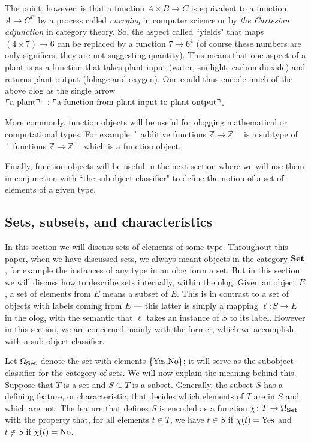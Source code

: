 \documentclass{amsart}
\def\to{\rightarrow}
\def\ZZ{{\mathbb Z}}
\def\ss{\subseteq}
\def\taking{\colon}
\def\cross{\times}
\def\Set{{\bf Set}}
\newcommand{\fakebox}[1]{\tn{$\ulcorner$#1$\urcorner$}}
\theoremstyle{remark}
\theoremstyle{definition}
\def\tn{\textnormal}
\begin{document}
{The point, however, is that a function $A\cross B\to C$ is equivalent to a function $A\to C^B$ by a process called {\em currying} in computer science or by {\em the Cartesian adjunction} in category theory. So, the aspect called ``yields" that maps $(4\cross 7)\to 6$ can be replaced by a function $7\to 6^4$ (of course these numbers are only signifiers; they are not suggesting quantity). This means that one aspect of a plant is as a function that takes plant input (water, sunlight, carbon dioxide) and returns plant output (foliage and oxygen). One could thus encode much of the above olog as the single arrow $\fakebox{a plant}\to\fakebox{a function from plant input to plant output}$. 

More commonly, function objects will be useful for ologging mathematical or computational types. For example \fakebox{additive functions $\ZZ\to\ZZ$} is a subtype of \fakebox{functions $\ZZ\to\ZZ$} which is a function object. 

Finally, function objects will be useful in the next section where we will use them in conjunction with ``the subobject classifier" to define the notion of a set of elements of a given type.

\subsection{Sets, subsets, and characteristics}\label{sec:sets}

In this section we will discuss sets of elements of some type. Throughout this paper, when we have discussed sets, we always meant objects in the category $\Set$, for example the instances of any type in an olog form a set. But in this section we will discuss how to describe sets internally, within the olog. Given an object $E$, a set of elements from $E$ means a subset of $E$. This is in contrast to a set of objects with labels coming from $E$ --- this latter is simply a mapping $\ell\taking S\to E$ in the olog, with the semantic that $\ell$ takes an instance of $S$ to its label. However in this section, we are concerned mainly with the former, which we accomplish with a sub-object classifier.

Let $\Omega_\Set$ denote the set with elements $\{\tn{Yes,No}\}$; it will serve as the subobject classifier for the category of sets. We will now explain the meaning behind this. Suppose that $T$ is a set and $S\ss T$ is a subset. Generally, the subset $S$ has a defining feature, or characteristic, that decides which elements of $T$ are in $S$ and which are not. The feature that defines $S$ is encoded as a function $\chi\taking T\to\Omega_\Set$ with the property that, for all elements $t\in T$, we have $t\in S$ if $\chi(t)=\tn{Yes}$ and $t\not\in S$ if $\chi(t)=\tn{No}$. 

}
\end{document}

